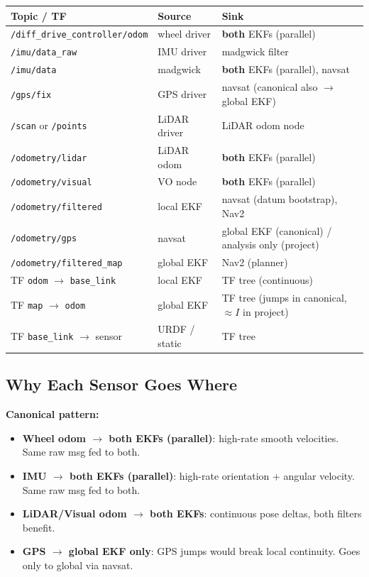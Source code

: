 \documentclass[11pt,a4paper]{article}
\begin{document}
\begin{center}
\footnotesize
\begin{tabular}{lll}
\toprule
\textbf{Topic / TF} & \textbf{Source} & \textbf{Sink}\\
\midrule
\texttt{/diff\_drive\_controller/odom} & wheel driver & \textbf{both} EKFs (parallel) \\
\texttt{/imu/data\_raw} & IMU driver & madgwick filter \\
\texttt{/imu/data} & madgwick & \textbf{both} EKFs (parallel), navsat \\
\texttt{/gps/fix} & GPS driver & navsat (canonical also $\to$ global EKF) \\
\texttt{/scan} or \texttt{/points} & LiDAR driver & LiDAR odom node \\
\texttt{/odometry/lidar} & LiDAR odom & \textbf{both} EKFs (parallel) \\
\texttt{/odometry/visual} & VO node & \textbf{both} EKFs (parallel) \\
\texttt{/odometry/filtered} & local EKF & navsat (datum bootstrap), Nav2 \\
\texttt{/odometry/gps} & navsat & global EKF (canonical) / analysis only (project) \\
\texttt{/odometry/filtered\_map} & global EKF & Nav2 (planner) \\
TF \texttt{odom} $\to$ \texttt{base\_link} & local EKF & TF tree (continuous) \\
TF \texttt{map} $\to$ \texttt{odom} & global EKF & TF tree (jumps in canonical, $\approx I$ in project) \\
TF \texttt{base\_link} $\to$ sensor & URDF / static & TF tree \\
\bottomrule
\end{tabular}
\end{center}

\subsection{Why Each Sensor Goes Where}

\textbf{Canonical pattern:}
\begin{itemize}
\item \textbf{Wheel odom $\to$ both EKFs (parallel)}: high-rate smooth velocities. Same raw msg fed to both.
\item \textbf{IMU $\to$ both EKFs (parallel)}: high-rate orientation + angular velocity. Same raw msg fed to both.
\item \textbf{LiDAR/Visual odom $\to$ both EKFs}: continuous pose deltas, both filters benefit.
\item \textbf{GPS $\to$ global EKF only}: GPS jumps would break local continuity. Goes only to global via navsat.
\end{itemize}
\end{document}
